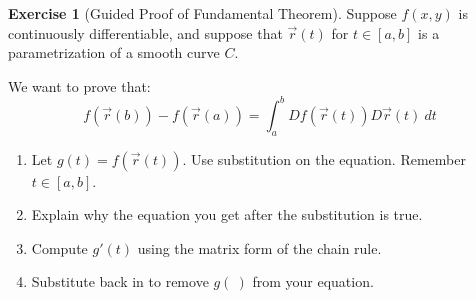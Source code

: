 \documentclass[10pt,]{book}
\theoremstyle{plain}
\theoremstyle{definition}
\theoremstyle{definition}
\theoremstyle{definition}
\theoremstyle{definition}
\newtheorem{exploration}[project]{Exercise}
\theoremstyle{definition}
\numberwithin{equation}{section}
\begin{document}
\begin{exploration}[Guided Proof of Fundamental Theorem]\label{prob_proof_of_fundamental_thm2}
Suppose \(f(x,y)\) is continuously differentiable, and suppose that \(\vec r(t)\) for \(t\in[a,b]\) is a parametrization of a smooth curve \(C\).%
\par
We want to prove that:%
\begin{equation*}
f(\vec r(b))-f(\vec r(a)) = \int_a^b Df(\vec r(t))D\vec r(t)\ dt
\end{equation*}
%
\begin{enumerate}[font=\bfseries,label=(\alph*),ref=\alph*]
\item\label{task-532} Let \(g(t) = f(\vec r(t))\). Use substitution on the equation. Remember \(t \in [a,b]\).%
\item\label{task-533} Explain why the equation you get after the substitution is true.%
\item\label{task-534} Compute \(g'(t)\) using the matrix form of the chain rule.%
\item\label{task-535} Substitute back in to remove \(g(\ )\) from your equation.%
\end{enumerate}
\end{exploration}
\end{document}

